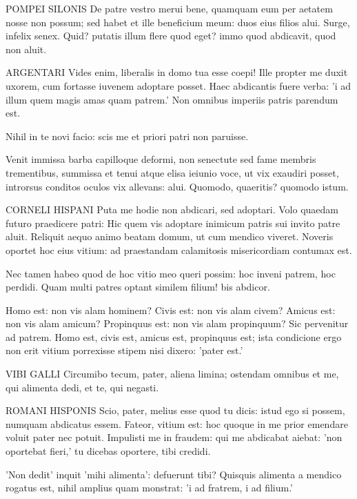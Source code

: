 \bigskip

POMPEI SILONIS De patre vestro merui bene, quamquam eum per aetatem nosse non possum; sed habet et ille beneficium meum: duos eius filios alui. Surge, infelix senex. Quid? putatis illum flere quod eget? immo quod abdicavit, quod non aluit.

\bigskip
	
ARGENTARI Vides enim, liberalis in domo tua esse coepi! Ille propter me duxit uxorem, cum fortasse iuvenem adoptare posset. Haec abdicantis fuere verba: 'i ad illum quem magis amas quam patrem.' Non omnibus imperiis patris parendum est. 

Nihil in te novi facio: scis me et priori patri non paruisse. 

Venit immissa barba capilloque deformi, non senectute sed fame membris trementibus, summissa et tenui atque elisa ieiunio voce, ut vix exaudiri posset, introrsus conditos oculos vix allevans: alui. Quomodo, quaeritis? quomodo istum. 	

\bigskip

CORNELI HISPANI Puta me hodie non abdicari, sed adoptari. Volo quaedam futuro praedicere patri: Hic quem vis adoptare inimicum patris sui invito patre aluit. Reliquit aequo animo beatam 	
domum, ut cum mendico viveret. Noveris oportet hoc eius vitium: ad praestandam calamitosis misericordiam contumax est. 

Nec tamen habeo quod de hoc vitio meo queri possim: hoc inveni patrem, hoc perdidi. Quam multi patres optant similem filium! bis abdicor. 

Homo est: non vis alam hominem? Civis est: non vis alam civem? Amicus est: non vis alam amicum? Propinquus est: non vis alam propinquum? Sic pervenitur ad patrem. Homo est, civis est, amicus est, propinquus est; ista condicione ergo non erit vitium porrexisse stipem nisi dixero: 'pater est.' 

\bigskip	

VIBI GALLI Circumibo tecum, pater, aliena limina; ostendam omnibus et me, qui alimenta dedi, et te, qui negasti. 

\bigskip	

ROMANI HISPONIS Scio, pater, melius esse quod tu dicis: istud ego si possem, numquam abdicatus essem. Fateor, vitium est: hoc quoque in me prior emendare voluit pater nec potuit. Impulisti me in fraudem: qui me abdicabat aiebat: 'non oportebat fieri,' tu dicebas oportere, tibi credidi. 

'Non dedit' inquit 'mihi alimenta': defuerunt tibi? Quisquis alimenta a mendico rogatus est, nihil amplius quam monstrat: 'i ad fratrem, i ad filium.' 	

